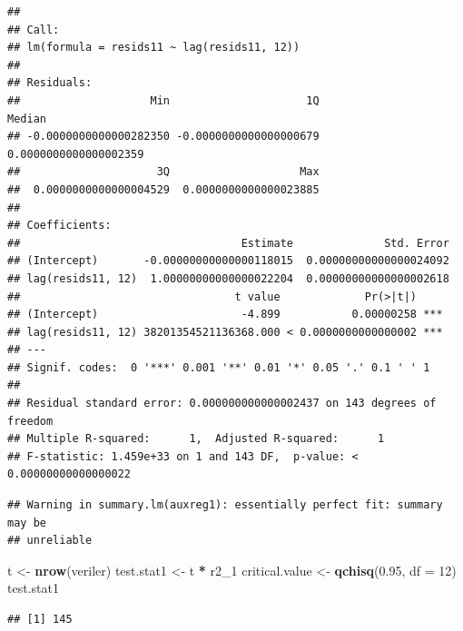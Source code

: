 \documentclass[]{article}
\newenvironment{Shaded}{\begin{snugshade}}{\end{snugshade}}
\newcommand{\KeywordTok}[1]{\textcolor[rgb]{0.13,0.29,0.53}{\textbf{#1}}}
\newcommand{\DataTypeTok}[1]{\textcolor[rgb]{0.13,0.29,0.53}{#1}}
\newcommand{\DecValTok}[1]{\textcolor[rgb]{0.00,0.00,0.81}{#1}}
\newcommand{\FloatTok}[1]{\textcolor[rgb]{0.00,0.00,0.81}{#1}}
\newcommand{\StringTok}[1]{\textcolor[rgb]{0.31,0.60,0.02}{#1}}
\newcommand{\OperatorTok}[1]{\textcolor[rgb]{0.81,0.36,0.00}{\textbf{#1}}}
\newcommand{\NormalTok}[1]{#1}
\begin{document}
\begin{verbatim}
## 
## Call:
## lm(formula = resids11 ~ lag(resids11, 12))
## 
## Residuals:
##                    Min                     1Q                 Median 
## -0.0000000000000282350 -0.0000000000000000679  0.0000000000000002359 
##                     3Q                    Max 
##  0.0000000000000004529  0.0000000000000023885 
## 
## Coefficients:
##                                  Estimate              Std. Error
## (Intercept)       -0.00000000000000118015  0.00000000000000024092
## lag(resids11, 12)  1.00000000000000022204  0.00000000000000002618
##                                 t value             Pr(>|t|)    
## (Intercept)                      -4.899           0.00000258 ***
## lag(resids11, 12) 38201354521136368.000 < 0.0000000000000002 ***
## ---
## Signif. codes:  0 '***' 0.001 '**' 0.01 '*' 0.05 '.' 0.1 ' ' 1
## 
## Residual standard error: 0.000000000000002437 on 143 degrees of freedom
## Multiple R-squared:      1,  Adjusted R-squared:      1 
## F-statistic: 1.459e+33 on 1 and 143 DF,  p-value: < 0.00000000000000022
\end{verbatim}

\begin{Shaded}
\end{Shaded}

\begin{verbatim}
## Warning in summary.lm(auxreg1): essentially perfect fit: summary may be
## unreliable
\end{verbatim}

\begin{Shaded}
\begin{Highlighting}[]
\NormalTok{t <-}\StringTok{ }\KeywordTok{nrow}\NormalTok{(veriler)}
\NormalTok{test.stat1 <-}\StringTok{ }\NormalTok{t }\OperatorTok{*}\StringTok{ }\NormalTok{r2_}\DecValTok{1}
\NormalTok{critical.value <-}\StringTok{ }\KeywordTok{qchisq}\NormalTok{(}\FloatTok{0.95}\NormalTok{, }\DataTypeTok{df =} \DecValTok{12}\NormalTok{)}
\NormalTok{test.stat1}
\end{Highlighting}
\end{Shaded}

\begin{verbatim}
## [1] 145
\end{verbatim}
\end{document}
